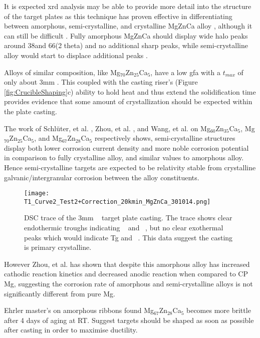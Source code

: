 \documentclass[a4paper,12pt,oneside]{report}%
\begin{document}
It is expected \gls{xrd} analysis may be able to provide more detail into the structure of the target plates as this technique has proven effective in differentiating between amorphous, semi-crystalline, and crystalline MgZnCa alloy \cite{Schluter2012, Wang2012}, although it can still be difficult \cite{Zhou2013}. Fully amorphous MgZnCa should display wide halo peaks around 38\degree and 66\degree (2 theta) and no additional sharp peaks, while semi-crystalline alloy would start to displace additional peaks \cite{Cao2013b, Gu2005, Wang2012, Gu2010, Cao2012}. 

Alloys of similar composition, like Mg$_{70}$Zn$_{25}$Ca$_{5}$, have a low \gls{gfa} with a $t_{max}$ of only about 3mm \cite{Gu2005, Zhou2013}. This coupled with the casting riser's (Figure \ref{fig:CrucibleShaping}c) ability to hold heat and thus extend the solidification time provides evidence that some amount of crystallization should be expected within the plate casting. 

The work of Schlüter, et al. \cite{Schluter2012}, Zhou, et al. \cite{Zhou2013}, and Wang, et al. \cite{Wang2012} on Mg$_{60}$Zn$_{35}$Ca$_{5}$, Mg$_{70}$Zn$_{25}$Ca$_{5}$, and Mg$_{67}$Zn$_{28}$Ca$_{5}$ respectively shows, semi-crystalline structures display both lower corrosion current density and more noble corrosion potential in comparison to fully crystalline alloy, and similar values to amorphous alloy. Hence semi-crystalline targets are expected to be relativity stable from crystalline galvanic/intergranular corrosion between the alloy constituents. 

\begin{figure}[htbp]
	\centering
	\texttt{[image: T1\_Curve2\_Test2+Correction\_20kmin\_MgZnCa\_301014.png]}
	\caption{DSC trace of the 3mm \MgZnCa~ target plate casting. The trace shows clear endothermic troughs indicating \Tm~ and \Tl~, but no clear exothermal peaks which would indicate \acrshort{Tg} and \Tx~. This data suggest the casting is primary crystalline.}
	\label{fig:DSCTarget1}
\end{figure}

However Zhou, et al. \cite{Zhou2013} has shown that despite this amorphous alloy has increased cathodic reaction kinetics and decreased anodic reaction when compared to CP Mg, suggesting the corrosion rate of amorphous and semi-crystalline alloys is not significantly different from pure Mg. 

Ehrler \cite{Ehrler2008} master's on amorphous ribbons found Mg$_{67}$Zn$_{28}$Ca$_{5}$ becomes more brittle after 4 days of aging at RT. Suggest targets should be shaped as soon as possible after casting in order to maximise ductility. 
\end{document}
